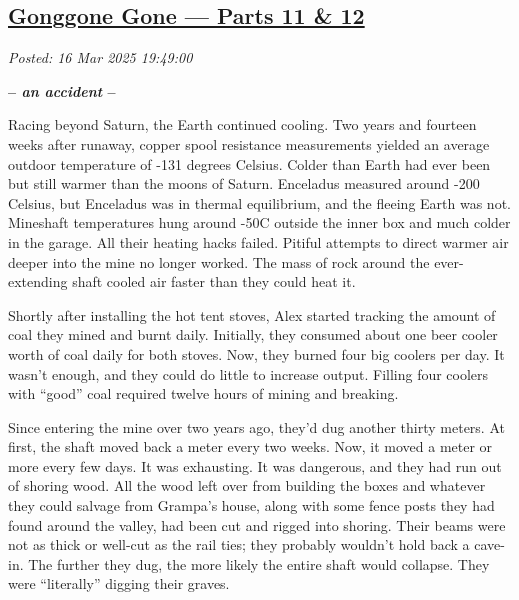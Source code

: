 %

\subsection*{\href{http://analyzethedatanotthedrivel.org/2025/03/16/gonggone-gone-parts-11-12/}{Gonggone Gone --- Parts 11 \& 12}}


\noindent\emph{Posted: 16 Mar 2025 19:49:00}
\vspace{6pt}

\begin{center}\large\textbf{-- \emph{an accident} --}\normalsize\end{center}

Racing beyond Saturn, the Earth continued cooling. Two years and
fourteen weeks after runaway, copper spool resistance measurements
yielded an average outdoor temperature of -131 degrees Celsius. Colder
than Earth had ever been but still warmer than the moons of Saturn.
Enceladus measured around -200 Celsius, but Enceladus was in thermal
equilibrium, and the fleeing Earth was not. Mineshaft temperatures hung
around -50C outside the inner box and much colder in the garage. All
their heating hacks failed. Pitiful attempts to direct warmer air deeper
into the mine no longer worked. The mass of rock around the
ever-extending shaft cooled air faster than they could heat it.

Shortly after installing the hot tent stoves, Alex started tracking the
amount of coal they mined and burnt daily. Initially, they consumed
about one beer cooler worth of coal daily for both stoves. Now, they
burned four big coolers per day. It wasn't enough, and they could do
little to increase output. Filling four coolers with ``good'' coal
required twelve hours of mining and breaking.

Since entering the mine over two years ago, they'd dug another thirty
meters. At first, the shaft moved back a meter every two weeks. Now, it
moved a meter or more every few days. It was exhausting. It was
dangerous, and they had run out of shoring wood. All the wood left over
from building the boxes and whatever they could salvage from Grampa's
house, along with some fence posts they had found around the valley, had
been cut and rigged into shoring. Their beams were not as thick or
well-cut as the rail ties; they probably wouldn't hold back a cave-in.
The further they dug, the more likely the entire shaft would collapse.
They were ``literally'' digging their graves.

